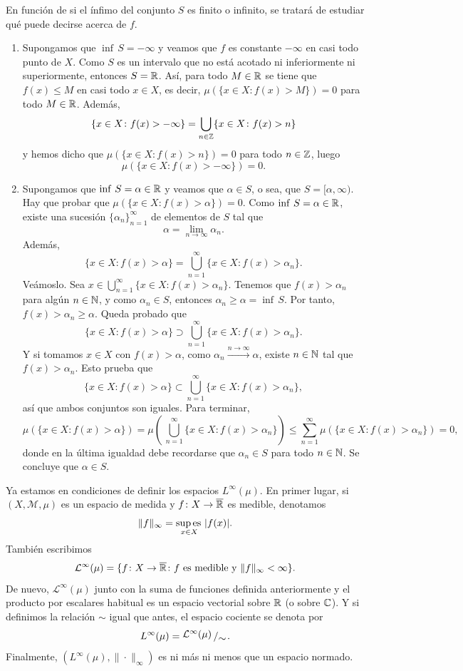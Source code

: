 \documentclass[a4paper, 11pt, oneside]{report}
\begin{document}
En función de si el ínfimo del conjunto $S$ es finito o infinito, se tratará de estudiar qué puede decirse acerca de $f$.
\begin{enumerate}
  \item Supongamos que $\inf \, S = -\infty$ y veamos que $f$ es constante $-\infty$ en casi todo punto de $X$. Como $S$ es un intervalo que no está acotado ni inferiormente ni superiormente, entonces $S = \mathbb R$. Así, para todo $M \in \mathbb R$ se tiene que $f(x) \leq M$ en casi todo $x \in X$, es decir, $\mu(\{x \in X \colon f(x)>M\}) = 0$ para todo $M \in \mathbb R$. Además,
  \[\{x \in X \colon f(x)> - \infty\} = \bigcup_{n \in \mathbb Z} \{x \in X \colon f(x)>n\}\]
  y hemos dicho que $\mu(\{x \in X \colon f(x)>n\}) = 0$ para todo $n \in \mathbb Z$, luego
  \[\mu(\{x \in X \colon f(x)>-\infty\}) = 0.\]
  \item Supongamos que $\inf \, S = \alpha \in \mathbb R$ y veamos que $\alpha \in S$, o sea, que $S = [\alpha,\infty)$. Hay que probar que $\mu(\{x \in X \colon f(x)> \alpha\}) = 0$. Como $\inf \, S = \alpha \in \mathbb R$, existe una sucesión $\{\alpha_n\}_{n=1}^\infty$ de elementos de $S$ tal que
  \[\alpha = \lim_{n \to \infty} \alpha_n.\]
  Además,
  \[\{x \in X \colon f(x)> \alpha\} = \bigcup_{n=1}^\infty \{x \in X \colon f(x)> \alpha_n\}.\]
  Veámoslo. Sea $x \in \bigcup_{n=1}^\infty \{x \in X \colon f(x)> \alpha_n\}$. Tenemos que $f(x) > \alpha_n$ para algún $n \in \mathbb N$, y como $\alpha_n \in S$, entonces $\alpha_n \geq \alpha = \inf \, S$. Por tanto, $f(x) > \alpha_n \geq \alpha$. Queda probado que
  \[\{x \in X \colon f(x)> \alpha\} \supset \bigcup_{n=1}^\infty \{x \in X \colon f(x)> \alpha_n\}.\]
  Y si tomamos $x \in X$ con $f(x) > \alpha$, como $\alpha_n \xrightarrow{n \to \infty} \alpha$, existe $n \in \mathbb N$ tal que $f(x)>\alpha_n$. Esto prueba que
  \[\{x \in X \colon f(x)> \alpha\} \subset \bigcup_{n=1}^\infty \{x \in X \colon f(x)> \alpha_n\},\]
  así que ambos conjuntos son iguales. Para terminar,
  \[\mu(\{x \in X \colon f(x) > \alpha\}) = \mu\left(\,\bigcup_{n =1}^\infty \{x \in X \colon f(x)>\alpha_n\}\right) \leq \sum_{n=1}^\infty \mu(\{x \in X \colon f(x)> \alpha_n\}) = 0,\]
  donde en la última igualdad debe recordarse que $\alpha_n \in S$ para todo $n \in \mathbb N$. Se concluye que $\alpha \in S$.
\end{enumerate}

Ya estamos en condiciones de definir los espacios $L^{\infty}(\mu)$. En primer lugar, si $(X,\mathcal{M},\mu)$ es un espacio de medida y $f \colon X \to \overline{\mathbb R}$ es medible, denotamos
\[\|f\|_\infty = \operatorname*{sup\,es\,}_{x \in X} |f(x)|.\]
También escribimos
\[\mathcal{L}^\infty(\mu) = \{f \colon X \to \overline{\mathbb R} \colon f \textup{ es medible y } \|f\|_\infty < \infty\}.\]
De nuevo, $\mathcal{L}^\infty(\mu)$ junto con la suma de funciones definida anteriormente y el producto por escalares habitual es un espacio vectorial sobre $\mathbb R$ (o sobre $\mathbb C$). Y si definimos la relación $\sim$ igual que antes, el espacio cociente se denota por
\[L^\infty(\mu) = \bigslant{\mathcal{L}^\infty(\mu)}{\sim}.\]
Finalmente, $(L^\infty(\mu),\|\cdot\|_\infty)$ es ni más ni menos que un espacio normado.
\end{document}

